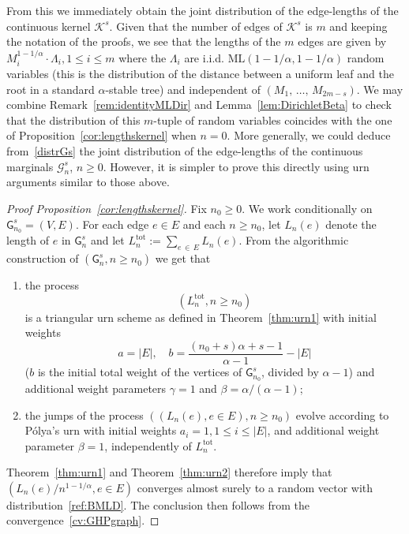\documentclass[AHL,Unicode,longabstracts,published]{cedram}
\newcommand{\ML}{\mathrm{ML}}
\newcommand{\totl}{\mathrm{tot}}
\newcommand{\cG}{\mathcal{G}}
\newcommand{\cK}{\mathcal{K}}
\newcommand{\sG}{\mathsf{G}}
\newcommand*{\alphenumi}{\renewcommand*{\theenumi}{\alph{enumi}}}
\begin{document}
From this we immediately obtain the joint distribution of the edge-lengths of the continuous kernel $\cK^s$. Given that the number of edges of $\cK^s$ is $m$ and keeping the notation of the proofs, we see that the lengths of the $m$ edges are given by $M_i^{1-1/\alpha} \cdot \Lambda_i, 1 \leq i\leq m$ where the $\Lambda_i$ are i.i.d. $\ML(1-1/\alpha,1-1/\alpha)$ random variables (this is the distribution of the distance between a uniform leaf and the root in a standard $\alpha$-stable tree) and independent of $(M_1,\,\ldots,\,M_{2m-s})$. We may combine Remark~\ref{rem:identityMLDir} and Lemma~\ref{lem:DirichletBeta} to check that the distribution of this $m$-tuple of random variables coincides with the one of Proposition~\ref{cor:lengthskernel} when $n=0$. More generally, we could deduce from~\eqref{distrGs} the joint distribution of the edge-lengths of the continuous marginals $\cG_n^s$, $n \geq 0$. However, it is simpler to prove this directly using urn arguments similar to those above.


\begin{proof}[Proof Proposition~\ref{cor:lengthskernel}] Fix $n_0 \geq 0$. We work conditionally on $\sG^s_{n_0}=(V,E)$. For each edge $e \in E$ and each $n \geq n_0$, let $L_n(e)$ denote the length of $e$ in $\sG^s_n$ and let $L_n^{\totl}:=\sum_{e\,\in\,E} L_n(e)$.
From the algorithmic construction of $(\sG^s_n,n \geq n_0)$ we get that
\begin{enumerate}\alphenumi
\item\label{proof prop1.7.a} the process
\[
\left(L_n^{\totl}, n \geq n_0\right)
\]
is a triangular urn scheme as defined in Theorem~\ref{thm:urn1} with initial weights
\[
a=|E|, \quad b=\frac{(n_0+s)\alpha+s-1}{\alpha-1}-|E|
\]
($b$ is the initial total weight of the vertices of $\sG^s_{n_0}$, divided by $\alpha-1$) and additional weight parameters $\gamma=1$ and $\beta=\alpha/(\alpha-1)$;
\item\label{proof prop1.7.b} the jumps of the process $((L_n(e),e \in E),n\geq n_0)$ evolve according to P{\'o}lya's urn with initial weights $a_i=1,1 \leq i \leq |E|$, and additional weight parameter $\beta=1$, independently of $L_n^{\totl}$.
\end{enumerate}
Theorem~\ref{thm:urn1} and Theorem~\ref{thm:urn2} therefore imply that $(L_n(e)/n^{1-1/\alpha}, e \in E)$ converges almost surely to a random vector with distribution~\eqref{ref:BMLD}. The conclusion then follows from the convergence~\eqref{cv:GHPgraph}.
\end{proof}
\end{document}

